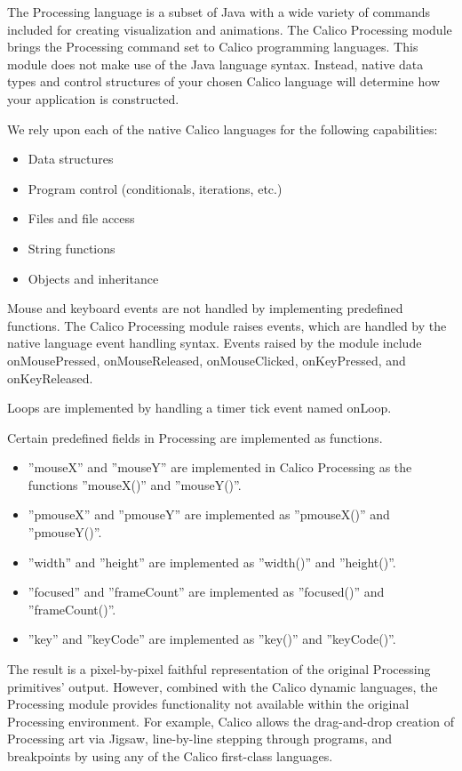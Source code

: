 \documentclass[preprint]{sigplanconf}
\begin{document}
The Processing language is a subset of Java with a wide variety of
commands included for creating visualization and animations. The
Calico Processing module brings the Processing command set to Calico
programming languages. This module does not make use of the Java
language syntax. Instead, native data types and control structures of
your chosen Calico language will determine how your application is
constructed.

We rely upon each of the native Calico languages for the following capabilities:

\begin{itemize}
\item Data structures
\item Program control (conditionals, iterations, etc.)
\item Files and file access
\item String functions
\item Objects and inheritance
\end{itemize}

Mouse and keyboard events are not handled by implementing predefined
functions. The Calico Processing module raises events, which are
handled by the native language event handling syntax. Events raised by
the module include onMousePressed, onMouseReleased, onMouseClicked,
onKeyPressed, and onKeyReleased.

Loops are implemented by handling a timer tick event named onLoop.

Certain predefined fields in Processing are implemented as functions.

\begin{itemize}
\item ''mouseX'' and ''mouseY'' are implemented in Calico Processing as the functions ''mouseX()'' and ''mouseY()''.
\item ''pmouseX'' and ''pmouseY'' are implemented as ''pmouseX()'' and ''pmouseY()''.
\item ''width'' and ''height'' are implemented as ''width()'' and ''height()''.
\item ''focused'' and ''frameCount'' are implemented as ''focused()'' and ''frameCount()''.
\item ''key'' and ''keyCode'' are implemented as ''key()'' and ''keyCode()''.
\end{itemize}

The result is a pixel-by-pixel faithful representation of the original
Processing primitives' output. However, combined with the Calico
dynamic languages, the Processing module provides functionality not
available within the original Processing environment. For example,
Calico allows the drag-and-drop creation of Processing art via Jigsaw,
line-by-line stepping through programs, and breakpoints by using any
of the Calico first-class languages.
\end{document}
